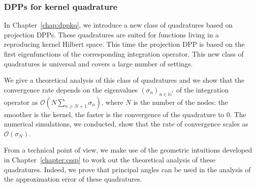 \documentclass[twoside,11pt]{book}
\newtheorem{theorem}{Theorem}
\numberwithin{theorem}{chapter}
\numberwithin{definition}{chapter}
\numberwithin{proposition}{chapter}
\numberwithin{corollary}{chapter}
\numberwithin{example}{chapter}
\numberwithin{lemma}{chapter}
\numberwithin{assumption}{chapter}
\DeclareMathOperator{\Det}{Det}
\DeclareMathOperator{\Fr}{\mathrm{Fr}}
\DeclareMathOperator{\VS}{\mathrm{VS}}
\DeclareMathOperator{\Tran}{\intercal}
\DeclareMathOperator{\EX}{\mathbb{E}}
\DeclareMathOperator{\Prb}{\mathbb{P}}
\begin{document}


\subsubsection{DPPs for kernel quadrature}

In Chapter~\ref{chap:dppkq}, we introduce a new class of quadratures based on projection DPPs. These quadratures are suited for functions living in a reproducing kernel Hilbert space. This time the projection DPP is based on the first eigenfunctions of the corresponding integration operator. 
This new class of quadratures is universal and covers a large number of settings. 


We give a theoretical analysis of this class of quadratures and we show that the convergence rate depends on the eigenvalues $(\sigma_{n})_{n \in \mathbb{N}^{*}}$ of the integration operator as $\mathcal{O}(N\sum_{n \geq N+1} \sigma_n)$, where $N$ is the number of the nodes: the smoother is the kernel, the faster is the convergence of the quadrature to $0$. The numerical simulations, we conducted, show that the rate of convergence scales as $\mathcal{O}(\sigma_{N})$.

From a technical point of view, we make use of the geometric intuitions developed in Chapter~\ref{chapter:cssp} to work out the theoretical analysis of these quadratures. Indeed, we prove that principal angles can be used in the analysis of the approximation error of these quadratures.
\end{document}

